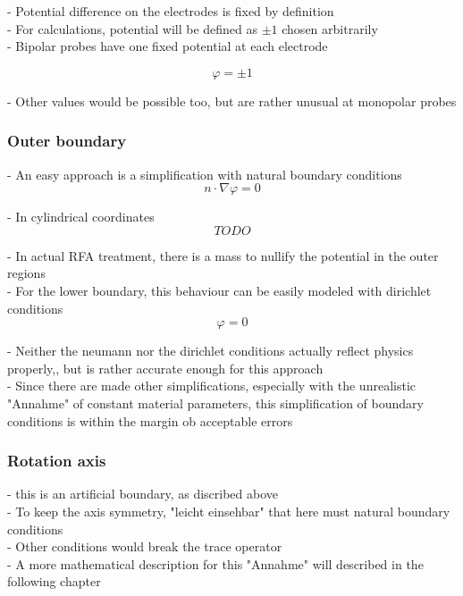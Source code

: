 \documentclass[parskip=half, titlepage=yes, 12pt, BCOR=12mm, DIV=calc]{scrartcl}
\begin{document}
- Potential difference on the electrodes is fixed by definition \\
- For calculations, potential will be defined as $\pm 1$ chosen arbitrarily \\
- Bipolar probes have one fixed potential at each electrode

\begin{equation}
    \varphi = \pm 1
\end{equation}

- Other values would be possible too, but are rather unusual at monopolar probes \\

\subsubsection{Outer boundary}

- An easy approach is a simplification with natural boundary conditions \\

\begin{equation}
    n \cdot \nabla \varphi = 0
\end{equation}

- In cylindrical coordinates
\begin{equation}
    TODO
\end{equation}

- In actual RFA treatment, there is a mass to nullify the potential in the outer regions \\
- For the lower boundary, this behaviour can be easily modeled with dirichlet conditions \\
\begin{equation}
    \varphi = 0
\end{equation}

- Neither the neumann nor the dirichlet conditions actually reflect physics properly,, but is rather accurate enough for this approach \\
- Since there are made other simplifications, especially with the unrealistic "Annahme" of constant material parameters, this simplification of boundary conditions is within the margin ob acceptable errors


\subsubsection{Rotation axis}

- this is an artificial boundary, as discribed above \\
- To keep the axis symmetry, "leicht einsehbar" that here must natural boundary conditions \\
- Other conditions would break the trace operator \\
- A more mathematical description for this "Annahme" will described in the following chapter
\end{document}
